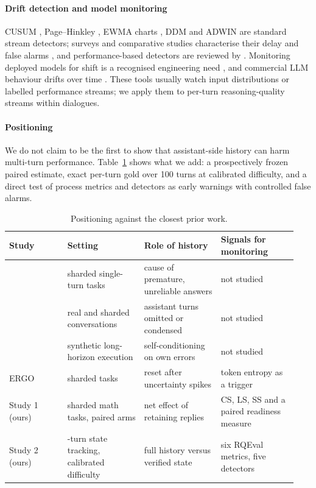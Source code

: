 \paragraph{Drift detection and model monitoring}
CUSUM \citep{page1954continuous}, Page--Hinkley \citep{hinkley1971inference},
EWMA charts \citep{roberts1959control}, DDM \citep{gama2004learning} and ADWIN
\citep{bifet2007learning} are standard stream detectors; surveys and
comparative studies characterise their delay and false alarms
\citep{gama2014survey,webb2016characterizing,lu2019learning,goncalves2014comparative},
and performance-based detectors are reviewed by \citet{bayram2022concept}.
Monitoring deployed models for shift is a recognised engineering need
\citep{sculley2015hidden,rabanser2019failing}, and commercial LLM behaviour
drifts over time \citep{chen2024chatgpt}. These tools usually watch input
distributions or labelled performance streams; we apply them to per-turn
reasoning-quality streams within dialogues.

\paragraph{Positioning}
We do not claim to be the first to show that assistant-side history can harm
multi-turn performance. Table~\ref{tab:positioning} shows what we add: a
prospectively frozen paired estimate, exact per-turn gold over 100 turns at
calibrated difficulty, and a direct test of process metrics and detectors as
early warnings with controlled false alarms.

\begin{table}[!htbp]
\centering
\caption{Positioning against the closest prior work.}
\label{tab:positioning}
\footnotesize
\setlength{\tabcolsep}{4pt}
\begin{tabular}{@{}>{\raggedright\arraybackslash}p{0.19\linewidth}
>{\raggedright\arraybackslash}p{0.25\linewidth}
>{\raggedright\arraybackslash}p{0.25\linewidth}
>{\raggedright\arraybackslash}p{0.25\linewidth}@{}}
\toprule
Study & Setting & Role of history & Signals for monitoring\\
\midrule
\citet{laban2025lost} & sharded single-turn tasks & cause of premature,
unreliable answers & not studied\\
\citet{huang2026benefit} & real and sharded conversations & assistant turns
omitted or condensed & not studied\\
\citet{sinha2025illusion} & synthetic long-horizon execution & self-conditioning
on own errors & not studied\\
ERGO \citep{khalid2025ergo} & sharded tasks & reset after uncertainty spikes &
token entropy as a trigger\\
Study 1 (ours) & sharded math tasks, paired arms & net effect of retaining
replies & CS, LS, SS and a paired readiness measure\\
Study 2 (ours) & 100-turn state tracking, calibrated difficulty & full history
versus verified state & six RQEval metrics, five detectors\\
\bottomrule
\end{tabular}
\end{table}
